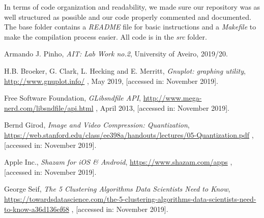 \documentclass[12pt]{article}
\begin{document}
In terms of code organization and readability, we made sure our 
repository was as well structured as possible and our code properly commented
and documented.
The base folder contains a {\it README\/} file for basic instructions and a 
{\it Makefile\/} to make the compilation process easier.
All code is in the {\it src\/} folder.

\newpage
\begin{thebibliography}{9}
  

    Armando J. Pinho,
    \textit{AIT: Lab Work no.2},
    University of Aveiro,
    2019/20.
  
    H.B. Broeker, G. Clark, L. Hecking and E. Merritt,
    \textit{Gnuplot: graphing utility},
    \url{http://www.gnuplot.info/} ,
    May 2019,
    [accessed in: November 2019].

    Free Software Foundation,
    \textit{GLibsndfile API},
    \url{http://www.mega-nerd.com/libsndfile/api.html} ,
    April 2013,
    [accessed in: November 2019].

    Bernd Girod,
    \textit{Image and Video Compression: Quantization},
    \url{https://web.stanford.edu/class/ee398a/handouts/lectures/05-Quantization.pdf} ,
    [accessed in: November 2019].

    Apple Inc.,
    \textit{Shazam for iOS \& Android},
    \url{https://www.shazam.com/apps} ,
    [accessed in: November 2019].

    George Seif,
    \textit{The 5 Clustering Algorithms Data Scientists Need to Know},
    \url{https://towardsdatascience.com/the-5-clustering-algorithms-data-scientists-need-to-know-a36d136ef68} ,
    [accessed in: November 2019].

\end{thebibliography}

\clearpage
\end{document}

